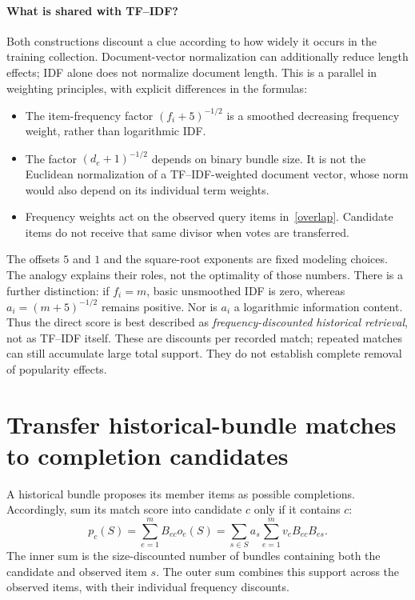 \documentclass[11pt,a4paper]{article}
\begin{document}
\paragraph{What is shared with TF--IDF?}
Both constructions discount a clue according to how widely it occurs in the
training collection. Document-vector normalization can additionally reduce length effects;
IDF alone does not normalize document length. This is a parallel in weighting principles, with
explicit differences in the formulas:
\begin{itemize}
\item The item-frequency factor $(f_i+5)^{-1/2}$ is a smoothed decreasing
frequency weight, rather than logarithmic IDF.
\item The factor $(d_e+1)^{-1/2}$ depends on binary bundle size. It is not the
Euclidean normalization of a TF--IDF-weighted document vector, whose norm would
also depend on its individual term weights.
\item Frequency weights act on the observed query items in~\eqref{overlap}.
Candidate items do not receive that same divisor when votes are transferred.
\end{itemize}
The offsets $5$ and $1$ and the square-root exponents are fixed modeling
choices. The analogy explains their roles, not the optimality of those numbers.
There is a further distinction: if $f_i=m$, basic unsmoothed IDF is zero,
whereas $a_i=(m+5)^{-1/2}$ remains positive. Nor is $a_i$ a logarithmic
information content. Thus the direct score is best described as
\emph{frequency-discounted historical retrieval}, not as TF--IDF itself.
These are discounts per recorded match; repeated matches can still accumulate
large total support. They do not establish complete removal of popularity effects.

\section{Transfer historical-bundle matches to completion candidates}
A historical bundle proposes its member items as possible completions.
Accordingly, sum its match score into candidate $c$ only if it contains $c$:
\begin{equation}\label{pair}
 \boxed{p_c(S)=\sum_{e=1}^mB_{ec}o_e(S)
 =\sum_{s\in S}a_s\sum_{e=1}^m v_eB_{ec}B_{es}.}
\end{equation}
The inner sum is the size-discounted number of bundles containing both the
candidate and observed item $s$. The outer sum combines this support across the
observed items, with their individual frequency discounts.
\end{document}
